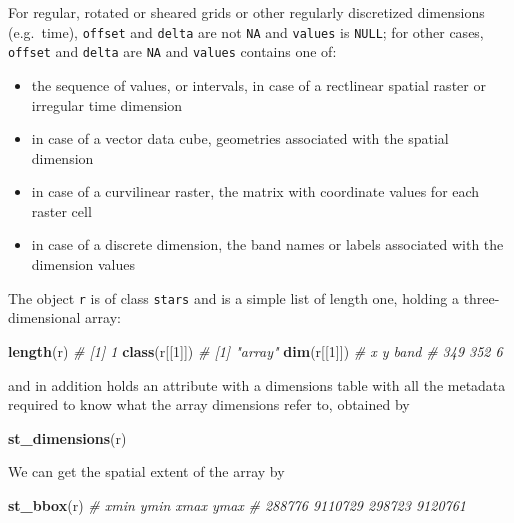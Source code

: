 \documentclass[]{book}
\newenvironment{Shaded}{\begin{snugshade}}{\end{snugshade}}
\newcommand{\CommentTok}[1]{\textcolor[rgb]{0.56,0.35,0.01}{\textit{#1}}}
\newcommand{\DecValTok}[1]{\textcolor[rgb]{0.00,0.00,0.81}{#1}}
\newcommand{\KeywordTok}[1]{\textcolor[rgb]{0.13,0.29,0.53}{\textbf{#1}}}
\newcommand{\NormalTok}[1]{#1}
\providecommand{\tightlist}{%
  \setlength{\itemsep}{0pt}\setlength{\parskip}{0pt}}
\begin{document}
For regular, rotated or sheared grids or other regularly discretized
dimensions (e.g.~time), \texttt{offset} and \texttt{delta} are not \texttt{NA}
and \texttt{values} is \texttt{NULL}; for other cases, \texttt{offset} and \texttt{delta} are
\texttt{NA} and \texttt{values} contains one of:

\begin{itemize}
\tightlist
\item
  the sequence of values, or intervals, in case of a rectlinear spatial raster or irregular time dimension
\item
  in case of a vector data cube, geometries associated with the spatial dimension
\item
  in case of a curvilinear raster, the matrix with coordinate values for each raster cell
\item
  in case of a discrete dimension, the band names or labels associated with the dimension values
\end{itemize}

The object \texttt{r} is of class \texttt{stars} and is a simple list of length
one, holding a three-dimensional array:

\begin{Shaded}
\begin{Highlighting}[]
\KeywordTok{length}\NormalTok{(r)}
\CommentTok{# [1] 1}
\KeywordTok{class}\NormalTok{(r[[}\DecValTok{1}\NormalTok{]])}
\CommentTok{# [1] "array"}
\KeywordTok{dim}\NormalTok{(r[[}\DecValTok{1}\NormalTok{]])}
\CommentTok{#    x    y band }
\CommentTok{#  349  352    6}
\end{Highlighting}
\end{Shaded}

and in addition holds an attribute with a dimensions table with all the metadata
required to know what the array dimensions refer to, obtained by

\begin{Shaded}
\begin{Highlighting}[]
\KeywordTok{st_dimensions}\NormalTok{(r)}
\end{Highlighting}
\end{Shaded}

We can get the spatial extent of the array by

\begin{Shaded}
\begin{Highlighting}[]
\KeywordTok{st_bbox}\NormalTok{(r)}
\CommentTok{#    xmin    ymin    xmax    ymax }
\CommentTok{#  288776 9110729  298723 9120761}
\end{Highlighting}
\end{Shaded}
\end{document}
